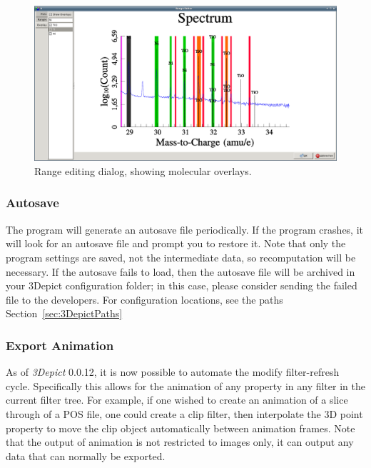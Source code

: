 \documentclass[10pt]{article}
\begin{document}
\begin{figure}
\begin{center}
 \includegraphics[width=0.9 \textwidth,keepaspectratio=true]{./figures/rangeEditOverlay.png}
 \caption{Range editing dialog, showing molecular overlays.}
\label{fig:rangeEditOverlay}
\end{center}
\end{figure}





\subsubsection{Autosave}
The program will generate an autosave file periodically. If the program crashes, it will look for an autosave file and prompt you to restore it. Note that only the program settings are saved, not the intermediate data, so recomputation will be necessary. If the autosave fails to load, then the autosave file will be archived in your 3Depict configuration folder; in this case, please consider sending the failed file to the developers. For configuration locations, see the paths Section~\ref{sec:3DepictPaths}


\subsubsection{Export Animation}
\label{sec:animationExport}As of \emph{3Depict} 0.0.12, it is now possible to automate the modify filter-refresh cycle. Specifically this allows for the animation of any property in any filter in the current filter tree. For example, if one wished to create an animation of a slice through of a POS file, one could create a clip filter, then interpolate the 3D point property to move the clip object automatically between animation frames. Note that the output of animation is not restricted to images only, it can output any data that can normally be exported. 
\end{document}
